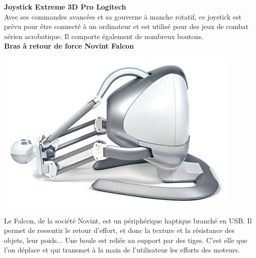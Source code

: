 \textbf{Joystick Extreme 3D Pro Logitech}
\\

Avec ses commandes avancées et sa gouverne à manche rotatif, ce joystick est prévu pour être connecté à un ordinateur et est utilisé pour des jeux de combat aérien acrobatique. Il comporte également de nombreux boutons.
\\

\textbf{Bras à retour de force Novint Falcon}
\\
\noindent\begin{minipage}{0.2\textwidth}
			\includegraphics[width=\linewidth]{1-PreEtude/img/falcon}
			\end{minipage}
			\hfill
			\begin{minipage}{0.8\textwidth}
			Le Falcon, de la société Novint, est un périphérique haptique branché en USB. Il permet de ressentir le retour d'effort, et donc la texture et la résistance des objets, leur poids... Une boule est reliée au support par des tiges. C'est elle que l'on déplace et qui transmet à la main de l'utilisateur les efforts des moteurs.
		\end{minipage}
\\

